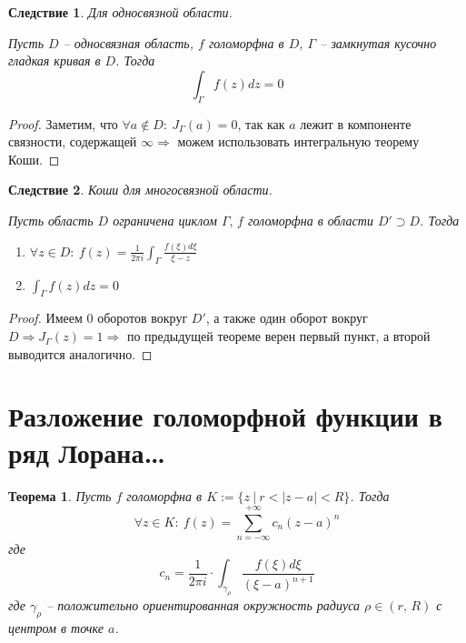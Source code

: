 \documentclass[a4paper,12pt]{article}
\theoremstyle{plain}
\newtheorem{theorem}{Теорема}[section]
\newtheorem*{corollary}{Следствие}
\theoremstyle{definition}
\theoremstyle{remark}
\begin{document}
\begin{corollary}
	Для односвязной области.

	Пусть $D$ -- односвязная область, $f$ голоморфна в $D$, $\Gamma$ -- замкнутая кусочно гладкая кривая в $D$. Тогда
	\[
		\int_\Gamma f(z)dz = 0
	\]
\end{corollary}

\begin{proof}
	Заметим, что $\forall a \not\in D :\: J_\Gamma(a) = 0$, так как $a$ лежит в компоненте связности, содержащей $\infty \Rightarrow$ можем использовать интегральную теорему Коши.
\end{proof}

\begin{corollary}
	Коши для многосвязной области.

	Пусть область $D$ ограничена циклом $\Gamma,\, f$ голоморфна в области $D' \supset D$. Тогда
	\begin{enumerate}
		\item $\forall z \in D :\: f(z) = \frac{1}{2\pi i}\int_\Gamma\frac{f(\xi)d\xi}{\xi - z}$
		\item $\int_\Gamma f(z)dz = 0$
	\end{enumerate}
\end{corollary}

\begin{proof}
	Имеем $0$ оборотов вокруг $D'$, а также один оборот вокруг $D \Rightarrow J_\Gamma(z) = 1 \Rightarrow$ по предыдущей теореме верен первый пункт, а второй выводится аналогично.
\end{proof}

\section{Разложение голоморфной функции в ряд Лорана\dots}
\begin{theorem}
	Пусть $f$ голоморфна в $K := \{z \:\vert\: r < \vert z - a\vert < R\}$. Тогда
	\[
		\forall z \in K :\: f(z) = \sum_{n = -\infty}^{+\infty}c_n(z - a)^n
	\]
	где
	\[
		c_n = \frac{1}{2\pi i}\cdot\int_{\gamma_\rho}\frac{f(\xi)d\xi}{(\xi - a)^{n + 1}}
	\]
	где $\gamma_\rho$ -- положительно ориентированная окружность радиуса $\rho \in (r,\, R)$ с центром в точке $a$.
\end{theorem}
\end{document}
